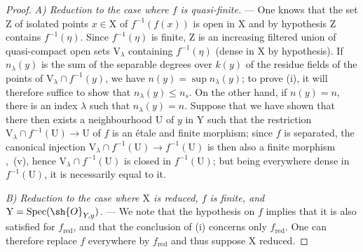\begin{proof}
\emph{A) Reduction to the case where $f$ is quasi-finite.} ---
One knows  that the set $\mathrm{Z}$ of isolated points $x\in\mathrm{X}$ of $f^{-1}(f(x))$ is open in $\mathrm{X}$ and by hypothesis $\mathrm{Z}$ contains $f^{-1}(\eta)$.
Since $f^{-1}(\eta)$ is finite, $\mathrm{Z}$ is an increasing filtered union of quasi-compact open sets $\mathrm{V}_\lambda$ containing $f^{-1}(\eta)$ (dense in $\mathrm{X}$ by hypothesis).
If $n_\lambda(y)$ is the sum of the separable degrees over $k(y)$ of the residue fields of the points of $\mathrm{V}_\lambda\cap f^{-1}(y)$, we have $n(y)=\sup n_\lambda(y)$; to prove (i), it will therefore suffice to show that $n_\lambda(y)\leq n_s$.
On the other hand, if $n(y)=n$, there is an index $\lambda$ such that $n_\lambda(y)=n$. Suppose that we have shown that there then exists a neighbourhood $\mathrm{U}$ of $y$ in $\mathrm{Y}$ such that the restriction $\mathrm{V}_\lambda\cap f^{-1}(\mathrm{U})\to\mathrm{U}$ of $f$ is an \'etale and finite morphism; since $f$ is separated, the canonical injection $\mathrm{V}_\lambda\cap f^{-1}(\mathrm{U})\to f^{-1}(\mathrm{U})$ is then also a finite morphism ,~(v), hence $\mathrm{V}_\lambda\cap f^{-1}(\mathrm{U})$ is closed in $f^{-1}(\mathrm{U})$; but being everywhere dense in $f^{-1}(\mathrm{U})$, it is necessarily equal to it.

\emph{B) Reduction to the case where $\mathrm{X}$ is reduced, $f$ is finite, and $\mathrm{Y}=\operatorname{Spec}(\sh{O}_{Y,y})$.} ---
We note that the hypothesis on $f$ implies that it is also satisfied for $f_{\mathrm{red}}$, and that the conclusion of (i) concerns only $f_{\mathrm{red}}$.
One can therefore replace $f$ everywhere by $f_{\mathrm{red}}$ and thus suppose $\mathrm{X}$ reduced.


\end{proof}
